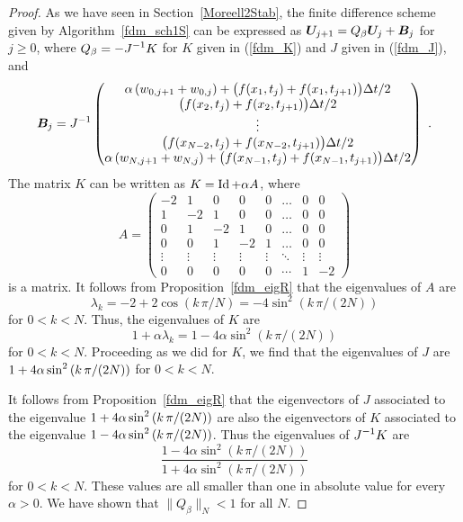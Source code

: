 \begin{proof}
As we have seen in Section~\ref{Moreell2Stab}, the finite difference
scheme given by Algorithm~\ref{fdm_sch1S} can be expressed as
$\bm{U}_{j+1} = Q_\beta\bm{U}_j + \bm{B}_j$ for $j\geq 0$, where
$\displaystyle Q_\beta = -J^{-1}K$ for $K$ given in (\ref{fdm_K}) and
$J$ given in (\ref{fdm_J}), and 
\[
\bm{B}_j = J^{-1} \begin{pmatrix}
\alpha \left( w_{0,j+1} + w_{0,j} \right)
+ \big( f(x_1,t_j) + f(x_1,t_{j+1}) \big)\Delta{t}/2 \\
\big( f(x_2,t_j) + f(x_2,t_{j+1}) \big)\Delta{t}/2 \\
\vdots \\
\big( f(x_{N-2},t_j) + f(x_{N-2},t_{j+1}) \big)\Delta{t}/2 \\
\alpha \left( w_{N,j+1} + w_{N,j} \right)
+ \big( f(x_{N-1},t_j)  + f(x_{N-1},t_{j+1}) \big)\Delta{t}/2
\end{pmatrix} \ .
\]
The matrix $K$ can be written as $K = \operatorname{Id} + \alpha A$, where
\[
A = \begin{pmatrix}
-2 & 1 & 0 & 0 & 0 & \ldots & 0 & 0 \\
1 & -2 & 1 & 0 & 0 & \ldots & 0 & 0  \\
0 & 1 & -2 & 1 & 0 & \ldots & 0 & 0 \\
0 & 0 & 1 & -2 & 1 & \ldots & 0 & 0 \\
\vdots & \vdots & \vdots & \vdots & \vdots & \ddots & \vdots & \vdots \\
0 & 0 & 0 & 0 & 0 & \cdots & 1 & -2
\end{pmatrix}
\]
is a  matrix.  It follows from
Proposition~\ref{fdm_eigR} that the eigenvalues of $A$ are
\[
\lambda_k = -2 + 2 \cos\left(k\,\pi/N\right)
= -4 \sin^2\left(k \,\pi/(2N)\right)
\]
for $0 < k < N$.  Thus, the eigenvalues of $K$ are
\[
  1+\alpha \lambda_k = 1 - 4 \alpha \sin^2\left(k\,\pi/(2N)\right)
\]
for $0 < k < N$.  Proceeding as we did for $K$, we find that the
eigenvalues of $J$ are
$\displaystyle 1 + 4 \alpha \sin^2\left(k\,\pi/(2N)\right)$
for $0 < k < N$.

It follows from Proposition~\ref{fdm_eigR} that the eigenvectors
of $J$ associated to the eigenvalue
$\displaystyle 1 + 4 \alpha \sin^2\left(k\,\pi/(2N)\right)$ are
also the eigenvectors of $K$ associated to the eigenvalue
$\displaystyle 1 - 4 \alpha \sin^2\left(k\,\pi/(2N)\right)$.
Thus the eigenvalues of $\displaystyle J^{-1} K$ are
\[
\frac{1 - 4 \alpha \sin^2\left(k\,\pi/(2N)\right)}
{1 + 4 \alpha \sin^2\left(k\,\pi/(2N)\right)}
\]
for $0 < k < N$.  These values are all smaller than one in absolute
value for every $\alpha>0$.  We have shown that $\|Q_\beta\|_N < 1$ for all
$N$.
\end{proof}

